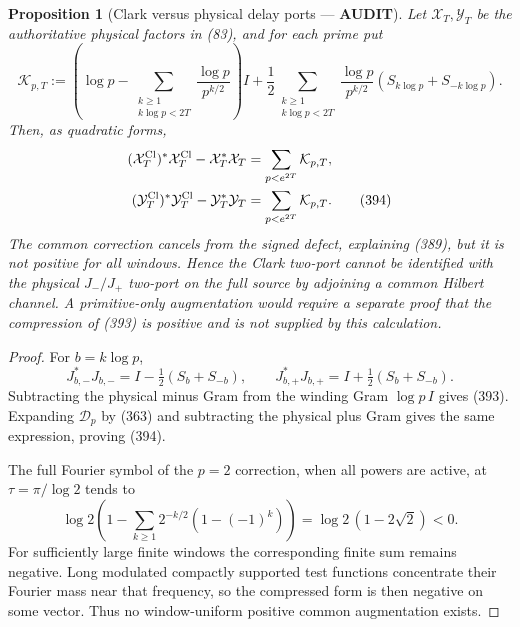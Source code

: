 \documentclass[11pt]{article}
\newtheorem{proposition}[theorem]{Proposition}
\newcommand{\AUDIT}{\textcolor{orange!75!black}{\textbf{AUDIT}}}
\begin{document}
\begin{proposition}[Clark versus physical delay ports --- \AUDIT]
Let $\mathcal X_T,\mathcal Y_T$ be the authoritative physical factors in
(83), and for each prime put
\begin{equation}
 \mathcal K_{p,T}:=
 \left(\log p-\sum_{\substack{k\ge1\\k\log p<2T}}
       \frac{\log p}{p^{k/2}}\right)I
 +\frac12\sum_{\substack{k\ge1\\k\log p<2T}}
       \frac{\log p}{p^{k/2}}
       (S_{k\log p}+S_{-k\log p}).                   \tag{393}
\end{equation}
Then, as quadratic forms,
\begin{align}
 (\mathcal X_T^{\rm Cl})^*\mathcal X_T^{\rm Cl}
       -\mathcal X_T^*\mathcal X_T
 &=\sum_{p<e^{2T}}\mathcal K_{p,T},\notag\\
 (\mathcal Y_T^{\rm Cl})^*\mathcal Y_T^{\rm Cl}
       -\mathcal Y_T^*\mathcal Y_T
 &=\sum_{p<e^{2T}}\mathcal K_{p,T}.                  \tag{394}
\end{align}
The common correction cancels from the signed defect, explaining (389), but
it is not positive for all windows.  Hence the Clark two-port cannot be
identified with the physical $J_-/J_+$ two-port on the full source by
adjoining a common Hilbert channel.  A primitive-only augmentation would
require a separate proof that the compression of (393) is positive and is
not supplied by this calculation.
\end{proposition}

\begin{proof}
For $b=k\log p$,
\[
 J_{b,-}^*J_{b,-}=I-\tfrac12(S_b+S_{-b}),\qquad
 J_{b,+}^*J_{b,+}=I+\tfrac12(S_b+S_{-b}).
\]
Subtracting the physical minus Gram from the winding Gram $\log p\,I$ gives
(393).  Expanding $\mathcal D_p$ by (363) and subtracting the physical plus
Gram gives the same expression, proving (394).

The full Fourier symbol of the $p=2$ correction, when all powers are active,
at $\tau=\pi/\log2$ tends to
\[
 \log2\left(1-\sum_{k\ge1}2^{-k/2}
                    (1-(-1)^k)\right)
 =\log2\,(1-2\sqrt2)<0.
\]
For sufficiently large finite windows the corresponding finite sum remains
negative.  Long modulated compactly supported test functions concentrate
their Fourier mass near that frequency, so the compressed form is then
negative on some vector.  Thus no window-uniform positive common
augmentation exists.
\end{proof}
\end{document}
